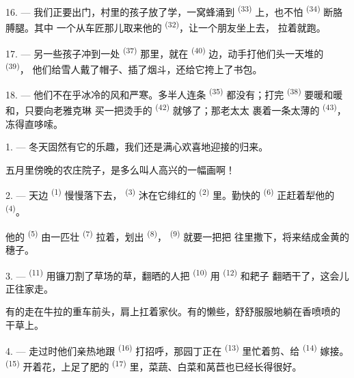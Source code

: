 16. --- 我们正要出门，村里的孩子放了学，一窝蜂涌到
\textsuperscript{(33)} 上，也不怕 \textsuperscript{(34)} 断胳膊腿。其中
一个从车匠那儿取来他的 \textsuperscript{(32)}，让一个朋友坐上去，
拉着就跑。

17. --- 另一些孩子冲到一处 \textsuperscript{(37)} 那里，就在
 \textsuperscript{(40)} 边，动手打他们头一天堆的 \textsuperscript{(39)}，
他们给雪人戴了帽子、插了烟斗，还给它挎上了书包。

18. --- 他们不在乎冰冷的风和严寒。多半人连条 \textsuperscript{(35)}
都没有；打完 \textsuperscript{(38)} 要暖和暖和，只要向老雅克琳
买一把烫手的 \textsuperscript{(42)} 就够了；那老太太
裹着一条太薄的 \textsuperscript{(43)}，冻得直哆嗦。

\VUsaut{3.0mm}
\VUsaut{3.0mm}

\VUsaut{4.0mm}

1. --- 冬天固然有它的乐趣，我们还是满心欢喜地迎接的归来。

五月里傍晚的农庄院子，是多么叫人高兴的一幅画啊！

2. --- 天边 \textsuperscript{(1)} 慢慢落下去，
\textsuperscript{(3)} 沐在它绯红的 \textsuperscript{(2)} 里。勤快的
\textsuperscript{(6)} 正赶着犁他的 \textsuperscript{(4)}。

他的 \textsuperscript{(5)} 由一匹壮 \textsuperscript{(7)}
拉着，划出 \textsuperscript{(8)}， \textsuperscript{(9)} 就要一把把
往里撒下，将来结成金黄的穗子。

3. ---  \textsuperscript{(11)} 用镰刀割了草场的草，翻晒的人把
 \textsuperscript{(10)} 用 \textsuperscript{(12)} 和耙子
翻晒干了，这会儿正往家走。

有的走在牛拉的重车前头，肩上扛着家伙。有的懒些，舒舒服服地躺在香喷喷的
干草上。

4. --- 走过时他们亲热地跟 \textsuperscript{(16)} 打招呼，那园丁正在
 \textsuperscript{(13)} 里忙着剪、给
\textsuperscript{(14)} 嫁接。 \textsuperscript{(15)} 开着花，上足了肥的
 \textsuperscript{(17)} 里，菜蔬、白菜和莴苣也已经长得很好。


